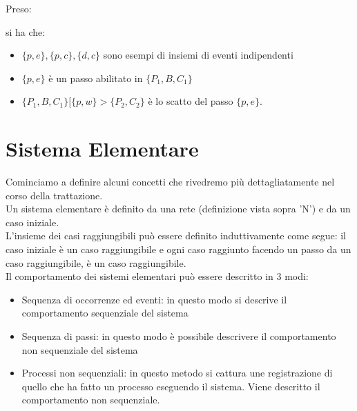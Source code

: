 \begin{esempio}
  Preso:
   \begin{center}
  \end{center}
  si ha che:
  \begin{itemize}
    \item $\{p, e\},\{p, c\},\{d, c\}$ sono esempi di insiemi di eventi
    indipendenti
    \item $\{p, e\}$ è un passo abilitato in $\{P_1, B, C_1\}$
    \item $\{P_1, B, C_1\}[\{p, w\}>\{P_2, C_2\}$ è lo scatto del passo
    $\{p, e\}$.
  \end{itemize}
\end{esempio}
\section{Sistema Elementare}
Cominciamo a definire alcuni concetti che rivedremo più dettagliatamente nel corso della trattazione.\\
Un sistema elementare è definito da una rete (definizione vista sopra ’N’) e da un caso iniziale.\\
L’insieme dei casi raggiungibili può essere definito induttivamente come segue: il caso iniziale è
un caso raggiungibile e ogni caso raggiunto facendo un passo da un caso raggiungibile, è un
caso raggiungibile.\\
Il comportamento dei sistemi elementari può essere descritto in 3 modi:
\begin{itemize}
    \item Sequenza di occorrenze ed eventi: in questo modo si descrive il comportamento sequenziale
del sistema
    \item Sequenza di passi: in questo modo è possibile descrivere il comportamento non sequenziale
del sistema
    \item Processi non sequenziali: in questo metodo si cattura une registrazione di quello che ha fatto
un processo eseguendo il sistema. Viene descritto il comportamento non sequenziale.
\end{itemize}

